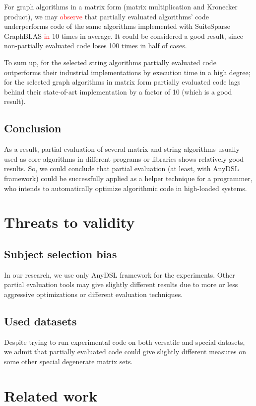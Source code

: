 \documentclass[conference]{IEEEtran}
\begin{document}
For graph algorithms in a matrix form (matrix multiplication and Kronecker product), we may \textcolor{red}{observe} that partially evaluated algorithms' code underperforms code of the same algorithms implemented with SuiteSparse GraphBLAS \textcolor{red}{in} 10 times in average. It could be considered a good result, since non-partially evaluated code loses 100 times in half of cases.

To sum up, for the selected string algorithms partially evaluated code outperforms their industrial implementations by execution time in a high degree; for the selected graph algorithms in matrix form partially evaluated code lags behind their state-of-art implementation by a factor of 10 (which is a good result).

\subsection{Conclusion}
As a result, partial evaluation of several matrix and string algorithms usually used as core algorithms in different programs or libraries shows relatively good results. So, we could conclude that partial evaluation (at least, with AnyDSL framework) could be successfully applied as a helper technique for a programmer, who intends to automatically optimize algorithmic code in high-loaded systems.


\section{Threats to validity}

\subsection{Subject selection bias}
In our research, we use only AnyDSL framework for the experiments. Other partial evaluation tools may give slightly different results due to more or less aggressive optimizations or different evaluation techniques.

\subsection{Used datasets}
Despite trying to run experimental code on both versatile and special datasets, we admit that partially evaluated code could give slightly different measures on some other special degenerate matrix sets.

\section{Related work}
\end{document}
